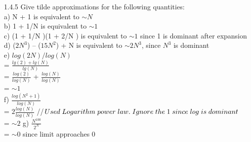 \documentclass[11pt,fleqn]{article}
\begin{document}
1.4.5 Give tilde approximations for the following quantities:\\
a) N + 1 is equivalent to $\sim N$\\
b) 1 + 1/N is equivalent to $\sim 1$\\
c) (1  +  1/N )(1  +  2/N ) is equivalent to $\sim 1$ since 1 is dominant after expansion\\
d) ($2N^3$) – ($15N^2$) + N is equivalent to $\sim2N^3$, since $N^3$ is dominant\\
e) $log(2N)/log(N)$\\
= $\frac{lg(2) + lg(N)}{lg(N)}$\\
= $\frac{log(2)}{log(N)}$ + $\frac{log(N)}{log(N)}$\\
= $\sim 1$\\
f) $\frac{log(N^2+1)}{log(N)}$\\
= $2 \frac{log(N)}{log(N)}$ //$Used \thickspace Logarithm \thickspace power \thickspace law. \thickspace Ignore \thickspace the \thickspace 1 \thickspace since \thickspace log \thickspace is \thickspace dominant$\\
= $\sim 2$
g) $\frac{N^100}{2^N}$\\
= $\sim 0$ since limit approaches 0
\end{document}
